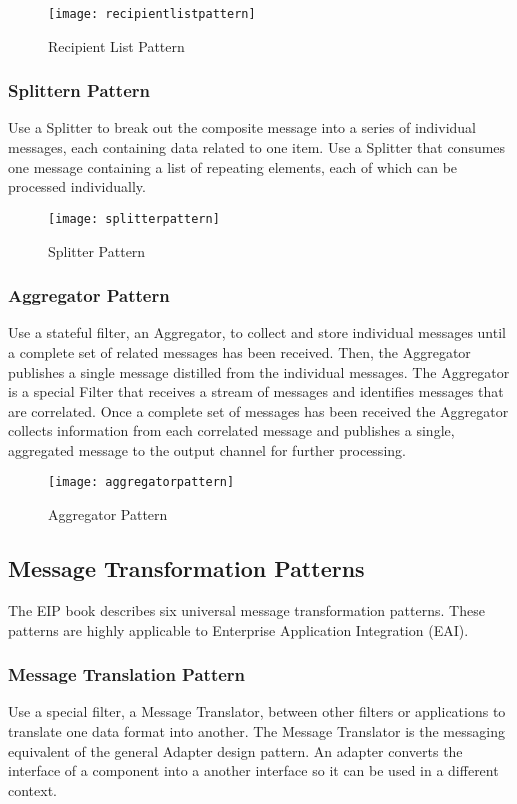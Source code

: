 \begin{figure}[H]
  \center
  \texttt{[image: recipientlistpattern]}
  \caption{Recipient List Pattern}
\end{figure}

\subsubsection{Splittern Pattern}
Use a Splitter to break out the composite message into a series of individual messages, each containing data related to one item. Use a Splitter that consumes one message containing a list of repeating elements, each of which can be processed individually.

\begin{figure}[H]
  \center
  \texttt{[image: splitterpattern]}
  \caption{Splitter Pattern}
\end{figure}

\subsubsection{Aggregator Pattern}
Use a stateful filter, an Aggregator, to collect and store individual messages until a complete set of related messages has been received. Then, the Aggregator publishes a single message distilled from the individual messages. The Aggregator is a special Filter that receives a stream of messages and identifies messages that are correlated. Once a complete set of messages has been received the Aggregator collects information from each correlated message and publishes a single, aggregated message to the output channel for further processing.

\begin{figure}[H]
  \center
  \texttt{[image: aggregatorpattern]}
  \caption{Aggregator Pattern}
\end{figure}

\pagebreak

\subsection{Message Transformation Patterns}
The EIP book describes six universal message transformation patterns. These patterns are highly applicable to Enterprise Application Integration (EAI).

\subsubsection{Message Translation Pattern}
Use a special filter, a Message Translator, between other filters or applications to translate one data format into another. The Message Translator is the messaging equivalent of the general Adapter design pattern. An adapter converts the interface of a component into a another interface so it can be used in a different context.

